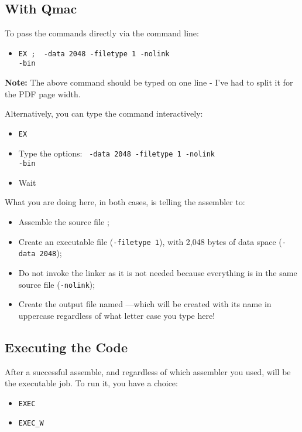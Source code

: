 \subsection{With Qmac}

To pass the commands directly via the command line:
\begin{itemize}
\item \texttt{EX ;~\textquotedbl{} -data 2048 -filetype 1 -nolink}~\\
\texttt{-bin \textquotedbl}
\end{itemize}
\textbf{Note:} The above command should be typed on one line - I've
had to split it for the PDF page width. 

Alternatively, you can type the command interactively:
\begin{itemize}
\item \texttt{EX }
\item Type the options: \texttt{ -data 2048 -filetype
1 -nolink }~\\
\texttt{-bin }
\item Wait
\end{itemize}
What you are doing here, in both cases, is telling the assembler to:
\begin{itemize}
\item Assemble the source file ;
\item Create an executable file (\texttt{-filetype 1}), with 2,048 bytes
of data space (\texttt{-data 2048});
\item Do not invoke the linker as it is not needed because everything is
in the same source file (\texttt{-nolink});
\item Create the output file named ---which
will be created with its name in uppercase regardless of what letter case you type here!
\end{itemize}

\subsection{Executing the Code}

After a successful assemble, and regardless of which assembler you
used,  will be the executable job. To run it, you have a choice:
\begin{itemize}
\item \texttt{EXEC} 
\item \texttt{EXEC\_W} 
\end{itemize}

